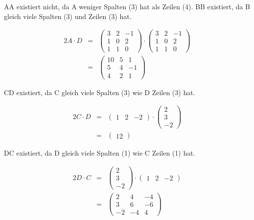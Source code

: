 \documentclass[10pt,a4paper,oneside,ngerman,numbers=noenddot]{scrartcl}
\begin{document}
AA existiert nicht, da A weniger Spalten (3) hat als Zeilen (4).
BB existiert, da B gleich viele Spalten (3) und Zeilen (3) hat.

\begin{alignat*}{2}
A \cdot D &=& \begin{pmatrix} 3 & 2 & -1 \\ 1 & 0 & 2 \\ 1 & 1 & 0 \end{pmatrix} \cdot \begin{pmatrix} 3 & 2 & -1 \\ 1 & 0 & 2 \\ 1 & 1 & 0 \end{pmatrix} \\
&=& \begin{pmatrix} 10 & 5 & 1 \\ 5 & 4 & -1 \\ 4 & 2 & 1 \end{pmatrix}
\end{alignat*}

CD existiert, da C gleich viele Spalten (3) wie D Zeilen (3) hat.

\begin{alignat*}{2}
C \cdot D &=& \begin{pmatrix} 1 & 2 & -2 \end{pmatrix} \cdot \begin{pmatrix} 2 \\ 3 \\ -2 \end{pmatrix} \\
&=& \begin{pmatrix} 12 \end{pmatrix}
\end{alignat*}

DC existiert, da D gleich viele Spalten (1) wie C Zeilen (1) hat.

\begin{alignat*}{2}
D \cdot C &=& \begin{pmatrix} 2 \\ 3 \\ -2 \end{pmatrix} \cdot \begin{pmatrix} 1 & 2 & -2 \end{pmatrix} \\
&=& \begin{pmatrix} 2 & 4 & -4 \\ 3 & 6 & -6 \\ -2 & -4 & 4 \end{pmatrix}
\end{alignat*}
\end{document}
